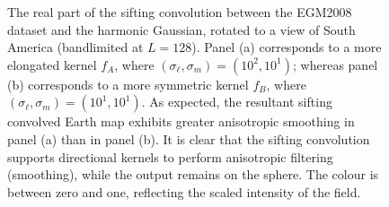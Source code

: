 \begin{figure}[htpb]
	\centering\capstart{}
	\hfill
	\caption[
		Two harmonic Gaussians convolved with a map of the Earth
	]{
		The real part of the sifting convolution between the EGM2008 dataset and the harmonic Gaussian, rotated to a view of South America (bandlimited at \(L=128\)).
		Panel (a) corresponds to a more elongated kernel \(f_{A}\), where \((\sigma_{\ell},\sigma_{m}) = (10^{2}, 10^{1})\); whereas panel (b) corresponds to a more symmetric kernel \(f_{B}\), where \((\sigma_{\ell},\sigma_{m}) = (10^{1}, 10^{1})\).
		As expected, the resultant sifting convolved Earth map exhibits greater anisotropic smoothing in panel (a) than in panel (b).
		It is clear that the sifting convolution supports directional kernels to perform anisotropic filtering (smoothing), while the output remains on the sphere.
		The colour is between zero and one, reflecting the scaled intensity of the field.
	}\label{fig:chapter3_convolved}
\end{figure}
